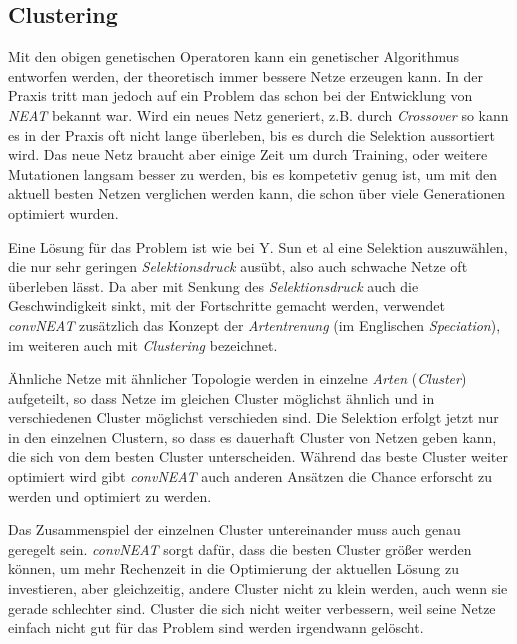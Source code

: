 \documentclass[]{scrartcl}
\begin{document}

		\subsection{Clustering}

			Mit den obigen genetischen Operatoren kann ein genetischer Algorithmus entworfen werden, der theoretisch immer bessere Netze erzeugen kann.
			In der Praxis tritt man jedoch auf ein Problem das schon bei der Entwicklung von \textit{NEAT} bekannt war.
			Wird ein neues Netz generiert, z.B. durch \textit{Crossover} so kann es in der Praxis oft nicht lange überleben, bis es durch die Selektion
			aussortiert wird. Das neue Netz braucht aber einige Zeit um durch Training, oder weitere Mutationen langsam besser zu werden, bis es
			kompetetiv genug ist, um mit den aktuell besten Netzen verglichen werden kann, die schon über viele Generationen optimiert wurden.

			Eine Lösung für das Problem ist wie bei Y. Sun et al \cite{convoneat} eine Selektion auszuwählen, die nur sehr geringen
			\textit{Selektionsdruck} ausübt, also auch schwache Netze oft überleben lässt. Da aber mit Senkung des \textit{Selektionsdruck}
			auch die Geschwindigkeit sinkt, mit der Fortschritte gemacht werden, verwendet \textit{convNEAT} zusätzlich das Konzept
			der \textit{Artentrenung} (im Englischen \textit{Speciation}), im weiteren auch mit \textit{Clustering} bezeichnet.

			Ähnliche Netze mit ähnlicher Topologie werden in einzelne \textit{Arten} (\textit{Cluster}) aufgeteilt, so dass Netze im gleichen
			Cluster möglichst ähnlich und in verschiedenen Cluster möglichst verschieden sind.
			Die Selektion erfolgt jetzt nur in den einzelnen Clustern, so dass es dauerhaft Cluster von Netzen geben kann, die sich von dem besten Cluster unterscheiden.
			Während das beste Cluster weiter optimiert wird gibt \textit{convNEAT} auch anderen Ansätzen die Chance erforscht zu werden und optimiert zu werden.

			Das Zusammenspiel der einzelnen Cluster untereinander muss auch genau geregelt sein. \textit{convNEAT} sorgt dafür, dass
			die besten Cluster größer werden können, um mehr Rechenzeit in die Optimierung der aktuellen Lösung zu investieren, aber gleichzeitig, andere
			Cluster nicht zu klein werden, auch wenn sie gerade schlechter sind. Cluster die sich nicht weiter verbessern, weil seine Netze einfach
			nicht gut für das Problem sind werden irgendwann gelöscht.
\end{document}
